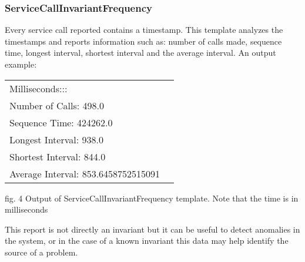 \documentclass[10pt, conference]{IEEEtran}
\begin{document}
\subsubsection{ServiceCallInvariantFrequency}
Every service call reported contains a timestamp. This template analyzes the timestamps and reports information such as: number of calls made, sequence time, longest interval, shortest interval and the average interval. An output example:  \newline
\begin{table}[h!]
 \begin{tabular}{l c} 
Milliseconds::: \\
Number of Calls: 498.0 \\
Sequence Time: 424262.0 \\
Longest Interval: 938.0 \\ 
Shortest Interval: 844.0 \\
Average Interval: 853.6458752515091 \\ [1ex] 
 \end{tabular}
 \begin{tablenotes}
	\scriptsize
      \item fig. 4 Output of ServiceCallInvariantFrequency template. Note that the time is in milliseconds  
    \end{tablenotes}
\end{table}
\normalsize

This report is not directly an invariant but it can be useful to detect anomalies in the system, or in the case of a known invariant this data may help identify the source of a problem. 
\end{document}
